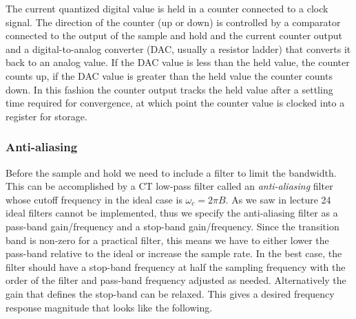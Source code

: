 The current quantized digital value is held in a counter connected to a clock signal. The direction of the counter (up or down) is controlled by a comparator connected to the output of the sample and hold and the current counter output and a digital-to-analog converter (DAC, usually a resistor ladder) that converts it back to an analog value. If the DAC value is less than the held value, the counter counts up, if the DAC value is greater than the held value the counter counts down. In this fashion the counter output tracks the held value after a settling time required for convergence, at which point the counter value is clocked into a register for storage.

\subsubsection{Anti-aliasing}

Before the sample and hold we need to include a filter to limit the bandwidth. This can be accomplished by a CT low-pass filter called an \emph{anti-aliasing} filter whose cutoff frequency in the ideal case is $\omega_c = 2\pi B$. As we saw in lecture 24 ideal filters cannot be implemented, thus we specify the anti-aliasing filter as a pass-band gain/frequency and a stop-band gain/frequency. Since the transition band is non-zero for a practical filter, this means we have to either lower the pass-band relative to the ideal or increase the sample rate. In the best case, the filter should have a stop-band frequency at half the sampling frequency with the order of the filter and pass-band frequency adjusted as needed. Alternatively the gain that defines the stop-band can be relaxed. This gives a desired frequency response magnitude that looks like the following.

